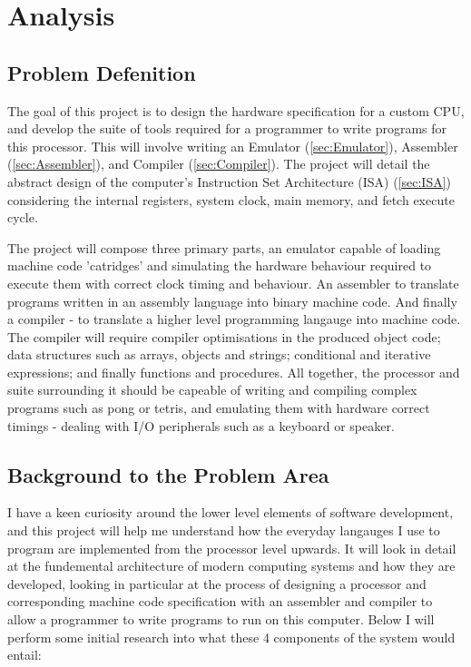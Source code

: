 \section{Analysis}
\subsection{Problem Defenition}
The goal of this project is to design the hardware specification for a custom CPU, and develop the suite of tools required for a programmer to write programs for this processor. This will involve writing an Emulator (\ref{sec:Emulator}), Assembler (\ref{sec:Assembler}), and Compiler (\ref{sec:Compiler}). The project will detail the abstract design of the computer’s Instruction Set Architecture (ISA) (\ref{sec:ISA}) considering the internal registers, system clock, main memory, and fetch execute cycle.

The project will compose three primary parts, an emulator capable of loading machine code 'catridges' and simulating the hardware behaviour required to execute them with correct clock timing and behaviour. An assembler to translate programs written in an assembly language into binary machine code. And finally a compiler - to translate a higher level programming langauge into machine code. The compiler will require compiler optimisations in the produced object code; data structures such as arrays, objects and strings; conditional and iterative expressions; and finally functions and procedures. All together, the processor and suite surrounding it should be capeable of writing and compiling complex programs such as pong or tetris, and emulating them with hardware correct timings - dealing with I/O peripherals such as a keyboard or speaker.

\subsection{Background to the Problem Area}
I have a keen curiosity around the lower level elements of software development, and this project will help me understand how the everyday langauges I use to program are implemented from the processor level upwards. It will look in detail at the fundemental architecture of modern computing systems and how they are developed, looking in particular at the process of designing a processor and corresponding machine code specification with an assembler and compiler to allow a programmer to write programs to run on this computer. Below I will perform some initial research into what these 4 components of the system would entail:

